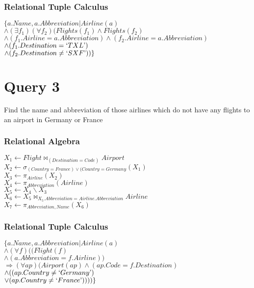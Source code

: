 \documentclass[a4paper,11pt,twoside]{article}
\begin{document}
\subsubsection*{Relational Tuple Calculus}
$\{a.Name, a.Abbreviation|Airline(a)$\\
$\land (\exists f_1)(\forall f_2)(Flights(f_1) \land Flights(f_2)$\\
$\land (f_1.Airline = a.Abbreviation) \land (f_2.Airline = a.Abbreviation)$\\
$\land (f_1.Destination = `TXL\textrm')$\\
$\land (f_2.Destination \neq `SXF\textrm'))\}$\\

\section*{Query 3}
Find the name and abbreviation of those airlines which do not have any flights to an airport in Germany or France
 
\subsubsection*{Relational Algebra}
$X_1 \leftarrow Flight \Join _{(Destination = Code)} Airport$\\
$X_2 \leftarrow \sigma_{(Country = France) \lor (Country = Germany}(X_1)$\\
$X_3 \leftarrow \pi_{Airline}(X_2)$\\
$X_4 \leftarrow \pi_{Abbreviation}(Airline)$\\
$X_5 \leftarrow X_4 \backslash X_3$\\
$X_6 \leftarrow X_5 \Join _{X_5.Abbreviation=Airline.Abbreviation} Airline$\\
$X_7 \leftarrow \pi_{Abbreviation, Name}(X_6)$\\



\subsubsection*{Relational Tuple Calculus}
$\{a.Name, a.Abbreviation|Airline(a)$\\
$ \land (\forall f)((Flight(f)$\\
$ \land (a.Abbreviation = f.Airline))$\\
$ \Rightarrow (\forall ap)(Airport(ap) \land (ap.Code = f.Destination)$\\
$ \land ((ap.Country \neq `Germany\textrm')$\\
$ \lor (ap.Country \neq `France\textrm'))))\}$\\
\end{document}
